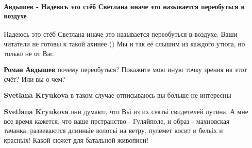  
 
 
 
 
\paragraph{Авдышев - Надеюсь это стёб Светлана иначе это называется переобуться в воздухе}

\begin{itemize}
 

Надеюсь это стёб Светлана иначе это называется переобуться в воздухе. Ваши
читатели не готовы к такой ахинее )) Мы и так её слышим из каждого утюга, но
только не от Вас.

\begin{itemize}

 
\textbf{Роман Авдышев} почему переобуться? Покажите мою иную точку зрения на этот счёт? Или вы о чем?

 
\textbf{Svetlana Kryukova} в таком случае отписываюсь вы больше не интересны

 
\textbf{Svetlana Kryukova} они думают, что Вьі из их сектьі свидетелей путина. А мне все время кажется, что ваше прстранство - Гуляйполе, и образ - махновская тачанка, развеваются длинньіе волосьі на ветру, пулемет косит и бельіх и красньіх! Какой сюжет для батальной живописи!


\end{itemize}
\end{itemize}
